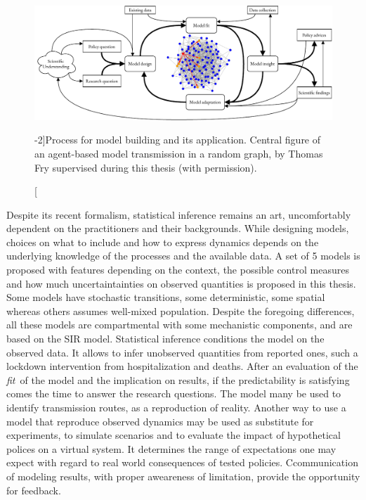 \begin{figure}\centering
  \includegraphics{fig/modeling_cycle_long}
  \caption[Process for model building and its application][-2\baselineskip]{Process for model building and its application. Central figure of an agent-based model transmission in a random graph, by Thomas Fry supervised during this thesis (with permission).}\label{fig:modeling}
\end{figure}

Despite its recent formalism, statistical inference remains an art, uncomfortably dependent on the practitioners and their backgrounds. While designing models, choices on what to include and how to express dynamics depends on the underlying knowledge of the processes and the available data. A set of 5 models is proposed with features depending on the context, the possible control measures and how much uncertaintainties on observed quantities is proposed in this thesis. Some models have stochastic transitions, some deterministic, some spatial whereas others assumes well-mixed population. Despite the foregoing differences, all these models are compartmental with some mechanistic components, and are based on the SIR model. 
Statistical inference conditions the model on the observed data. It allows to infer unobserved quantities from reported ones, such a lockdown intervention from hospitalization and deaths. After an evaluation of the \textit{fit} of the model and the implication on results, if the predictability is satisfying comes the time to answer the research questions. The model many be used to identify transmission routes, as a reproduction of reality. Another way to use a model that reproduce observed dynamics may be used as substitute for experiments, to simulate scenarios and to evaluate the impact of hypothetical polices on a virtual system. It determines the range of expectations one may expect with regard to real world consequences of tested policies. Ccommunication of modeling results, with proper aweareness of limitation, provide the opportunity for feedback\cite{Heesterbeek:ModelingInfectiousDisease:2015}.

